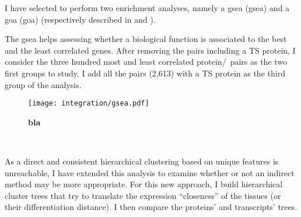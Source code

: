 I have selected to perform two enrichment analyses,
namely a \glsdesc{gsea} (\gls{gsea}) and a \glsdesc{goa} (\gls{goa})
(respectively described in
 and ).

The \gls{gsea} helps assessing whether
a biological function is associated to
the best and the least correlated genes.
After removing the pairs including a \gls{TS} protein,
I consider the three hundred most and least correlated protein/\mRNA\ pairs
as the two first groups to study.
I add all the pairs (2,613) with a \gls{TS} protein as the third group of the analysis.

\begin{landscape}
    \begin{figure}
        \texttt{[image: integration/gsea.pdf]}\centering
        \caption[bla]{\label{fig:gseai}\textbf{bla}}
    \end{figure}
\end{landscape}

\begin{comment}
\begin{figure}[!htbp]
\texttt{[image: integration/OtherGroups]}\centering
    \caption[Examples of particular GO
    categories]{\label{fig:GO_sub_groups}\textbf{Examples of particular GO
    categories.}}
\end{figure}
\end{comment}




\clearpage\


As a direct and consistent hierarchical clustering
based on unique features is unreachable,
I have extended this analysis to examine whether or not an indirect method
may be more appropriate.
For this new approach,
I build hierarchical cluster trees that try to translate
the expression \enquote{closeness} of the tissues
(or their differentiation distance).
I then compare the proteins' and transcripts' trees.\\
\vspace{-\baselineskip}

